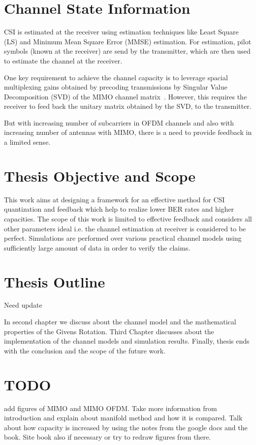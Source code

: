 \documentclass[11pt,a4paper]{report}
\begin{document}
\section{Channel State Information}     
CSI is estimated at the receiver using estimation techniques like Least Square (LS)
and Minimum Mean Square Error (MMSE) estimation. For estimation, pilot symbols
(known at the receiver) are send by the transmitter, which are then used to estimate
the channel at the receiver.

One key requirement to achieve the channel capacity is to leverage spacial multiplexing gains
obtained by precoding transmissions by Singular Value Decomposition (SVD) of the MIMO
channel matrix~\cite{love2008overview}. However, this requires the receiver to
feed back the unitary matrix obtained by the SVD, to the transmitter.

But with increasing number of subcarriers in OFDM channels and also with 
increasing number of antennas with MIMO, there is a need to provide
feedback in a limited sense.

\section{Thesis Objective and Scope}
This work aims at designing a framework for an effective method for CSI quantization
and feedback which help to realize lower BER rates and higher capacities. The scope 
of this work is limited to effective feedback and considers all other parameters
ideal i.e. the channel estimation at receiver is considered to be perfect. Simulations
are performed over various practical channel models using sufficiently large amount
of data in order to verify the claims.

\section{Thesis Outline}
Need update

In second chapter we discuss about the channel model and the mathematical properties
of the Givens Rotation. Third Chapter discusses about the implementation of the channel
models and simulation results. Finally, thesis ends with the conclusion and the scope 
of the future work.

\section{TODO}
add figures of MIMO and MIMO OFDM. Take more information from introduction and 
explain about manifold method and how it is compared.
Talk about how capacity is increased by using the notes from the google docs and
the book. Site book also if necessary or try to redraw figures from there.
\end{document}

